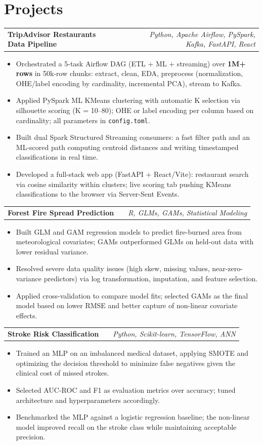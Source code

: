 \documentclass[a4paper,10pt]{article}
\makeatletter
\newenvironment{joblong}[2]
    {
    \begin{tabularx}{\linewidth}{@{}l X r@{}}
    \textbf{#1} & \hfill & \textit{\small #2} \\[3pt]
    \end{tabularx}
    \begin{minipage}[t]{\linewidth}
    \begin{itemize}[nosep,after=\strut,leftmargin=1em,itemsep=2pt,label=\textbullet]
    }
    {
    \end{itemize}
    \end{minipage}\vspace{6pt}
    }
\makeatother
\begin{document}
\section{Projects}

\begin{joblong}{TripAdvisor Restaurants Data Pipeline}{Python, Apache Airflow, PySpark, Kafka, FastAPI, React}
\item Orchestrated a 5-task Airflow DAG (ETL + ML + streaming) over \textbf{1M+ rows} in 50k-row chunks: extract, clean, EDA, preprocess (normalization, OHE/label encoding by cardinality, incremental PCA), stream to Kafka.
\item Applied PySpark ML KMeans clustering with automatic K selection via silhouette scoring (K = 10--80); OHE or label encoding per column based on cardinality; all parameters in \texttt{config.toml}.
\item Built dual Spark Structured Streaming consumers: a fast filter path and an ML-scored path computing centroid distances and writing timestamped classifications in real time.
\item Developed a full-stack web app (FastAPI + React/Vite): restaurant search via cosine similarity within clusters; live scoring tab pushing KMeans classifications to the browser via Server-Sent Events.
\end{joblong}

\begin{joblong}{Forest Fire Spread Prediction}{R, GLMs, GAMs, Statistical Modeling}
\item Built GLM and GAM regression models to predict fire-burned area from meteorological covariates; GAMs outperformed GLMs on held-out data with lower residual variance.
\item Resolved severe data quality issues (high skew, missing values, near-zero-variance predictors) via log transformation, imputation, and feature selection.
\item Applied cross-validation to compare model fits; selected GAMs as the final model based on lower RMSE and better capture of non-linear covariate effects.
\end{joblong}

\begin{joblong}{Stroke Risk Classification}{Python, Scikit-learn, TensorFlow, ANN}
\item Trained an MLP on an imbalanced medical dataset, applying SMOTE and optimizing the decision threshold to minimize false negatives given the clinical cost of missed strokes.
\item Selected AUC-ROC and F1 as evaluation metrics over accuracy; tuned architecture and hyperparameters accordingly.
\item Benchmarked the MLP against a logistic regression baseline; the non-linear model improved recall on the stroke class while maintaining acceptable precision.
\end{joblong}
\end{document}
